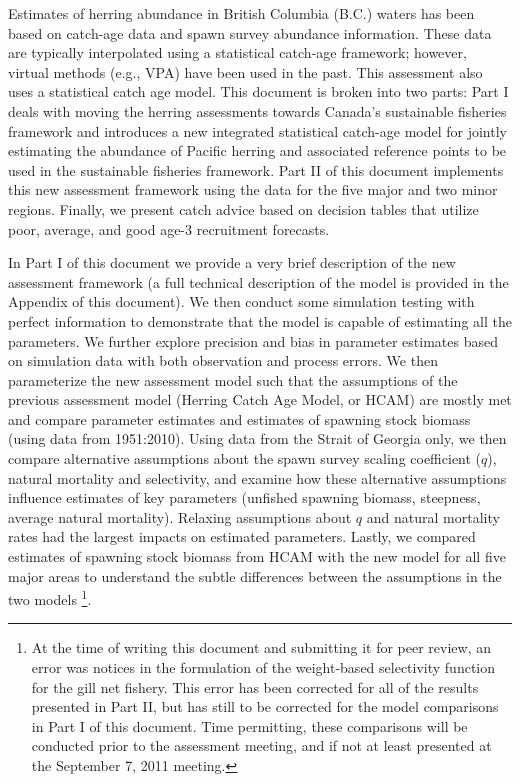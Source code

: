 Estimates of herring abundance in British Columbia (B.C.) waters  has been based on catch-age data and spawn survey abundance information.  These data are typically interpolated using a statistical catch-age framework; however, virtual methods (e.g., VPA) have been used in the past. This assessment also uses a statistical catch age model.  This document is broken into two parts: Part I deals with moving the herring assessments towards Canada's sustainable fisheries framework and introduces a new integrated statistical catch-age model for jointly estimating the abundance of Pacific herring and associated reference points to be used in the sustainable fisheries framework.  Part II of this document  implements this new assessment framework using the data for the five major and two minor regions.  Finally, we present catch advice based on decision tables that utilize poor, average, and good age-3 recruitment forecasts.

In Part I of this document we provide a very brief description of the new assessment framework (a full technical description of the model is provided in the Appendix of this document).  We then conduct some simulation testing with perfect information to  demonstrate that the model is capable of estimating all the parameters. We further explore precision and bias in parameter estimates based on simulation data with both observation and process errors.  We then parameterize the new assessment model such that the assumptions of the previous assessment model (Herring Catch Age Model, or HCAM) are mostly met and compare parameter estimates and estimates of spawning stock biomass (using data from 1951:2010).  Using data from the Strait of Georgia only, we then compare alternative assumptions about the spawn survey scaling coefficient ($q$), natural mortality and selectivity, and examine how these alternative assumptions influence estimates of key parameters (unfished spawning biomass, steepness, average natural mortality).  Relaxing assumptions about $q$ and natural mortality rates had the largest impacts on estimated parameters.  Lastly, we compared estimates of spawning stock biomass from HCAM with the new model for all five major areas to understand the subtle differences between the assumptions in the two models \footnote{At the time of writing this document and submitting it for peer review, an error was notices in the formulation of the weight-based selectivity function for the gill net fishery.  This error has been corrected for all of the results presented in Part II, but has still to be corrected for the model comparisons in Part I of this document.  Time permitting, these comparisons will be conducted prior to the assessment meeting, and if not at least presented at the September 7, 2011 meeting.}.

